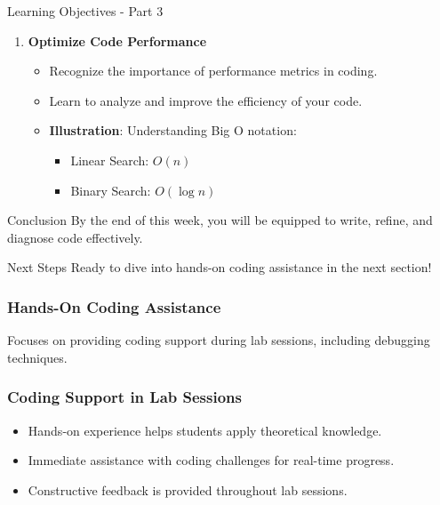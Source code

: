 \documentclass[aspectratio=169]{beamer}
\begin{document}
\begin{frame}{Learning Objectives - Part 3}
    \begin{enumerate}[start=4]
        \item \textbf{Optimize Code Performance}
            \begin{itemize}
                \item Recognize the importance of performance metrics in coding.
                \item Learn to analyze and improve the efficiency of your code.
                \item \textbf{Illustration}: Understanding Big O notation:
                    \begin{itemize}
                        \item Linear Search: $O(n)$
                        \item Binary Search: $O(\log n)$
                    \end{itemize}
            \end{itemize}
    \end{enumerate}
    
    \begin{block}{Conclusion}
        By the end of this week, you will be equipped to write, refine, and diagnose code effectively.
    \end{block}
\end{frame}

\begin{frame}{Next Steps}
    Ready to dive into hands-on coding assistance in the next section!
\end{frame}

\begin{frame}[fragile]
  \frametitle{Hands-On Coding Assistance}
  Focuses on providing coding support during lab sessions, including debugging techniques.
\end{frame}

\begin{frame}[fragile]
  \frametitle{Coding Support in Lab Sessions}
  \begin{itemize}
    \item Hands-on experience helps students apply theoretical knowledge.
    \item Immediate assistance with coding challenges for real-time progress.
    \item Constructive feedback is provided throughout lab sessions.
  \end{itemize}
\end{frame}
\end{document}
